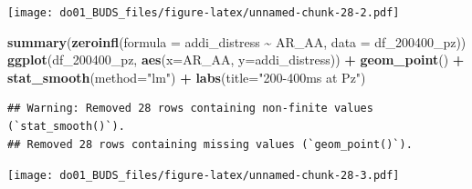 \documentclass[
]{article}
\newenvironment{Shaded}{\begin{snugshade}}{\end{snugshade}}
\newcommand{\AttributeTok}[1]{\textcolor[rgb]{0.13,0.29,0.53}{#1}}
\newcommand{\DecValTok}[1]{\textcolor[rgb]{0.00,0.00,0.81}{#1}}
\newcommand{\FunctionTok}[1]{\textcolor[rgb]{0.13,0.29,0.53}{\textbf{#1}}}
\newcommand{\NormalTok}[1]{#1}
\newcommand{\SpecialCharTok}[1]{\textcolor[rgb]{0.81,0.36,0.00}{\textbf{#1}}}
\newcommand{\StringTok}[1]{\textcolor[rgb]{0.31,0.60,0.02}{#1}}
\begin{document}
\begin{Shaded}
\end{Shaded}

\texttt{[image: do01\_BUDS\_files/figure-latex/unnamed-chunk-28-2.pdf]}

\begin{Shaded}
\begin{Highlighting}[]
\FunctionTok{summary}\NormalTok{(}\FunctionTok{zeroinfl}\NormalTok{(}\AttributeTok{formula =}\NormalTok{ addi\_distress }\SpecialCharTok{\textasciitilde{}}\NormalTok{ AR\_AA, }\AttributeTok{data =}\NormalTok{ df\_200400\_pz))}
\FunctionTok{ggplot}\NormalTok{(df\_200400\_pz, }\FunctionTok{aes}\NormalTok{(}\AttributeTok{x=}\NormalTok{AR\_AA, }\AttributeTok{y=}\NormalTok{addi\_distress)) }\SpecialCharTok{+}
  \FunctionTok{geom\_point}\NormalTok{() }\SpecialCharTok{+}
  \FunctionTok{stat\_smooth}\NormalTok{(}\AttributeTok{method=}\StringTok{"lm"}\NormalTok{) }\SpecialCharTok{+}
  \FunctionTok{labs}\NormalTok{(}\AttributeTok{title=}\StringTok{"200{-}400ms at Pz"}\NormalTok{)}
\end{Highlighting}
\end{Shaded}

\begin{verbatim}
## Warning: Removed 28 rows containing non-finite values (`stat_smooth()`).
## Removed 28 rows containing missing values (`geom_point()`).
\end{verbatim}

\texttt{[image: do01\_BUDS\_files/figure-latex/unnamed-chunk-28-3.pdf]}

\begin{Shaded}
\end{Shaded}
\end{document}
